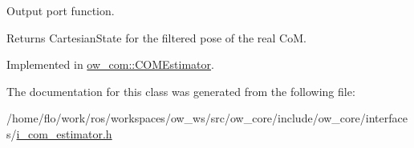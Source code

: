 Output port function. 

\begin{DoxyReturn}{Returns}
Cartesian\+State for the filtered pose of the real CoM. 
\end{DoxyReturn}


Implemented in \hyperlink{classow__com_1_1COMEstimator_af0474ec2ab3a61d06ab3dd80c70b0b2e}{ow\+\_\+com\+::\+C\+O\+M\+Estimator}.



The documentation for this class was generated from the following file\+:\begin{DoxyCompactItemize}
\item 
/home/flo/work/ros/workspaces/ow\+\_\+ws/src/ow\+\_\+core/include/ow\+\_\+core/interfaces/\hyperlink{i__com__estimator_8h}{i\+\_\+com\+\_\+estimator.\+h}\end{DoxyCompactItemize}
